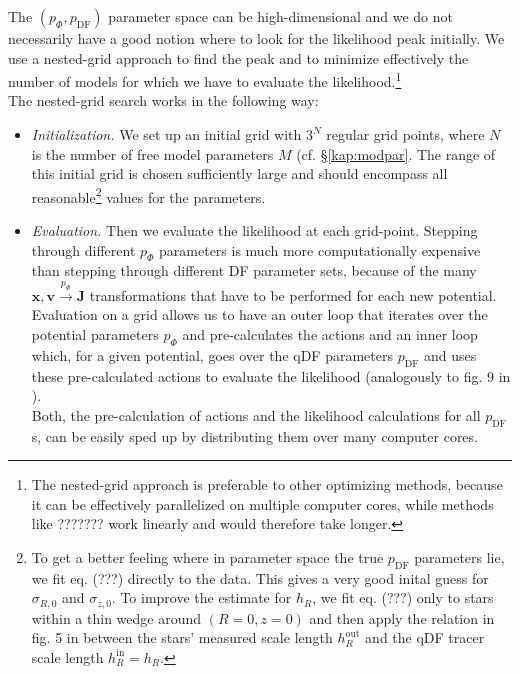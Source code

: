 \documentclass[12pt,preprint]{aastex}
\newcommand{\vect}[1]{\boldsymbol{#1}} %
\begin{document}
The $(p_\Phi,p_\text{DF})$ parameter space can be high-dimensional and we do not necessarily have a good notion where to look for the likelihood peak initially. We use a nested-grid approach to find the peak and to minimize effectively the number of models for which we have to evaluate the likelihood.\footnote{The nested-grid approach is preferable to other optimizing methods, because it can be effectively parallelized on multiple computer cores, while methods like ??????? work linearly and would therefore take longer.}
\\The nested-grid search works in the following way: 
\begin{itemize}

\item \emph{Initialization.} We set up an initial grid with $3^N$ regular grid points, where $N$ is the number of free model parameters $M$ (cf. \S\ref{kap:modpar}. The range of this initial grid is chosen sufficiently large and should encompass all reasonable\footnote{To get a better feeling where in parameter space the true $p_\text{DF}$ parameters lie, we fit eq. (???) directly to the data. This gives a very good inital guess for $\sigma_{R,0}$ and $\sigma_{z,0}$. To improve the estimate for $h_R$, we fit eq. (???) only to stars within a thin wedge around $(R=0,z=0)$ and then apply the relation in fig. 5 in \citet{bov13} between the stars' measured scale length $h_R^\text{out}$ and the qDF tracer scale length $h_R^\text{in}=h_R$.} values for the parameters. 

\item  \emph{Evaluation.} Then we evaluate the likelihood at each grid-point. Stepping through different $p_\Phi$ parameters is much more computationally expensive than stepping through different DF parameter sets, because of the many $\vect{x},\vect{v} \overset{p_\Phi}{\longrightarrow} \vect{J}$ transformations that have to be performed for each new potential. Evaluation on a grid allows us to have an outer loop that iterates over the potential parameters $p_\Phi$ and pre-calculates the actions and an inner loop which, for a given potential, goes over the qDF parameters $p_\text{DF}$ and uses these pre-calculated actions to evaluate the likelihood (analogously to fig. 9 in \citet{bov13}).
\\Both, the pre-calculation of actions and the likelihood calculations for all $p_\text{DF}$s, can be easily sped up by distributing them over many computer cores.


\end{itemize}
\end{document}
